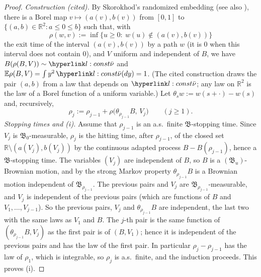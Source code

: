 \documentclass[11pt]{article}
\newcommand{\R}{\mathbb{R}}
\newcommand{\E}{\mathbb{E}}
\newcommand{\1}{\mathbf{1}}
\begin{document}
\begin{proof}
\textit{Construction (cited).} By Skorokhod's randomized embedding \citet[Section~37]{Bil95} (see also \citealp{Obl04}), there is a Borel map $v\mapsto(a(v),b(v))$ from $[0,1]$ to
$\{(a,b)\in\R^2:a\le0\le b\}$ such that, with
\[
\rho(w,v):=\inf\big\{u\ge0:\ w(u)\notin(a(v),b(v))\big\}
\]
the exit time of the interval $(a(v),b(v))$ by a path $w$ (it is $0$ when this interval does not contain $0$), and $V$ uniform and independent of $B$, we have
$B(\rho(B,V))\sim\lnub$ and $\E\rho(B,V)=\int y^2\,\lnub(dy)=1$. (The cited construction draws the pair $(a,b)$ from a law that depends on $\lnub$; any law on $\R^2$ is
the law of a Borel function of a uniform variable.) Let $\theta_sw:=w(s+\cdot)-w(s)$ and, recursively,
\[
\rho_j:=\rho_{j-1}+\rho\big(\theta_{\rho_{j-1}}B,\,V_j\big)\qquad(j\ge1).
\]
\textit{Stopping times and (i).} Assume that $\rho_{j-1}$ is an a.s.\ finite $\mathfrak B$-stopping time. Since $V_j$ is $\mathfrak B_0$-measurable, $\rho_j$ is the hitting
time, after $\rho_{j-1}$, of the closed set $\R\setminus(a(V_j),b(V_j))$ by the continuous adapted process $B-B(\rho_{j-1})$, hence a $\mathfrak B$-stopping time. The variables
$(V_j)$ are independent of $B$, so $B$ is a $(\mathfrak B_u)$-Brownian motion, and by the strong Markov property \citep{RY99} $\theta_{\rho_{j-1}}B$ is a Brownian motion
independent of $\mathfrak B_{\rho_{j-1}}$. The previous pairs and $V_j$ are $\mathfrak B_{\rho_{j-1}}$-measurable, and $V_j$ is independent of the previous pairs (which are
functions of $B$ and $V_1,\dots,V_{j-1}$). So the previous pairs, $V_j$ and $\theta_{\rho_{j-1}}B$ are independent, the last two with the same laws as $V_1$ and $B$. The
$j$-th pair is the same function of $(\theta_{\rho_{j-1}}B,V_j)$ as the first pair is of $(B,V_1)$; hence it is independent of the previous pairs and has the law of the
first pair. In particular $\rho_j-\rho_{j-1}$ has the law of $\rho_1$, which is integrable, so $\rho_j$ is a.s.\ finite, and the induction proceeds. This proves (i).


\end{proof}
\end{document}
